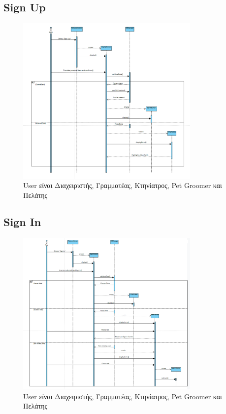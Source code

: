 \documentclass[12pt,a4paper,twoside]{book}
\begin{document}
\subsection{Sign Up}
\begin{figure}[H]
    \centering
    \includegraphics[width=0.8\textwidth]{Resources/Sequence Diagram/Sign_Up_SD.png}
    \caption{User είναι Διαχειριστής, Γραμματέας, Κτηνίατρος, Pet Groomer και Πελάτης}\label{fig:sequence-signup}
\end{figure}

\subsection{Sign In}
\begin{figure}[H]
    \centering
    \includegraphics[width=0.8\textwidth]{Resources/Sequence Diagram/Sign_In_SD.png}
    \caption{User είναι Διαχειριστής, Γραμματέας, Κτηνίατρος, Pet Groomer και Πελάτης}\label{fig:sequence-signin}
\end{figure}
\end{document}
